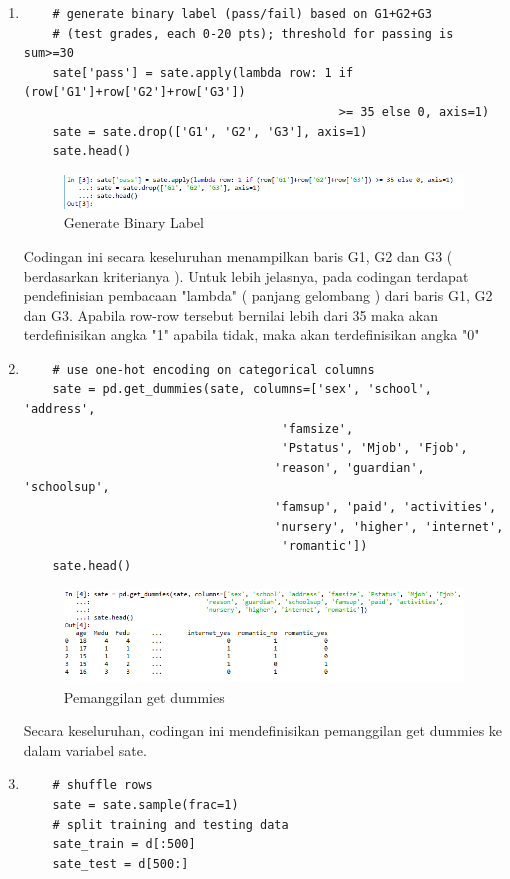 \begin{enumerate}
\item
\begin{verbatim}
	# generate binary label (pass/fail) based on G1+G2+G3 
	# (test grades, each 0-20 pts); threshold for passing is sum>=30
	sate['pass'] = sate.apply(lambda row: 1 if (row['G1']+row['G2']+row['G3']) 
											>= 35 else 0, axis=1)
	sate = sate.drop(['G1', 'G2', 'G3'], axis=1)
	sate.head()
\end{verbatim}
\begin{figure}[ht]
\centering
\includegraphics[scale=0.6]{figures/42.png}
\caption{Generate Binary Label}
\end{figure}
\par
	Codingan ini secara keseluruhan menampilkan  baris  G1, G2 dan G3 ( berdasarkan kriterianya ). Untuk lebih jelasnya, pada codingan terdapat pendefinisian pembacaan "lambda" ( panjang gelombang ) dari baris G1, G2 dan G3. Apabila row-row tersebut bernilai lebih dari 35 maka akan terdefinisikan angka "1" apabila tidak, maka akan terdefinisikan angka "0"
\item
\begin{verbatim}
	# use one-hot encoding on categorical columns
	sate = pd.get_dummies(sate, columns=['sex', 'school', 'address', 
									'famsize', 
									'Pstatus', 'Mjob', 'Fjob', 
	                               'reason', 'guardian', 'schoolsup', 
								   'famsup', 'paid', 'activities',
	                               'nursery', 'higher', 'internet', 
									'romantic'])
	sate.head()
\end{verbatim}
\begin{figure}[ht]
\centering
\includegraphics[scale=0.6]{figures/421.png}
\caption{Pemanggilan get dummies}
\end{figure}
\par
	Secara keseluruhan, codingan ini mendefinisikan pemanggilan get dummies ke dalam variabel sate.

\item
\begin{verbatim}
	# shuffle rows
	sate = sate.sample(frac=1)
	# split training and testing data
	sate_train = d[:500]
	sate_test = d[500:]


\end{verbatim}
\end{enumerate}
